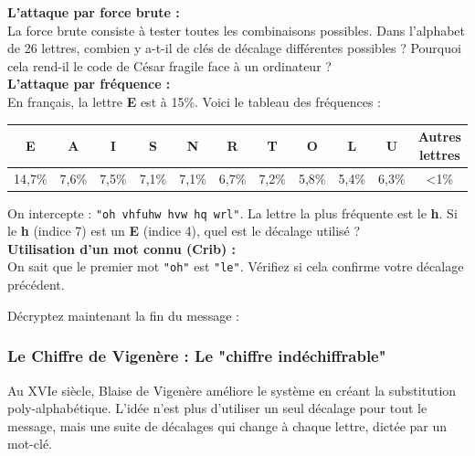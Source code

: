 \begin{Exercise}[title={Vulnérabilité : Les attaques}]
\textbf{L'attaque par force brute :}\\
La force brute consiste à tester toutes les combinaisons possibles.
\Question Dans l'alphabet de 26 lettres, combien y a-t-il de clés de décalage différentes possibles ? \dotfill
\Question Pourquoi cela rend-il le code de César fragile face à un ordinateur ? \dotfill\\

\textbf{L'attaque par fréquence :}\\
En français, la lettre \textbf{E} est à 15\%. Voici le tableau des fréquences :
\begin{center}
\begin{tabular}{|c|c|c|c|c|c|c|c|c|c|c|}
\hline
E & A & I & S & N & R & T & O & L & U & Autres lettres\\ \hline
14,7\% & 7,6\% & 7,5\% & 7,1\% & 7,1\% & 6,7\% & 7,2\% & 5,8\% & 5,4\% & 6,3\% & <1\%\\ \hline
\end{tabular}
\end{center}



\Question On intercepte : \texttt{"oh vhfuhw hvw hq wrl"}. La lettre la plus fréquente est le \textbf{h}. Si le \textbf{h} (indice 7) est un \textbf{E} (indice 4), quel est le décalage utilisé ? \dotfill \\

\textbf{Utilisation d'un mot connu (Crib) :}\\
\Question On sait que le premier mot \texttt{"oh"} est \texttt{"le"}. Vérifiez si cela confirme votre décalage précédent. \\
\emptybox{2cm}

\Question Décryptez maintenant la fin du message : \dotfill
\end{Exercise}

\newpage

\subsubsection*{Le Chiffre de Vigenère : Le "chiffre indéchiffrable"}

Au XVIe siècle, Blaise de Vigenère améliore le système en créant la substitution poly-alphabétique. L'idée n'est plus d'utiliser un seul décalage pour tout le message, mais une suite de décalages qui change à chaque lettre, dictée par un mot-clé.

